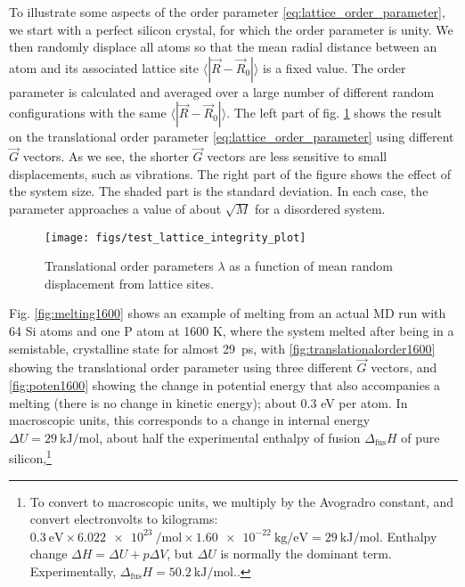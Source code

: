\documentclass[11pt,bibliography=totoc,index=totoc]{scrbook}   %
\begin{document}

To illustrate some aspects of the order parameter \ref{eq:lattice_order_parameter}, we start with a perfect silicon crystal, 
for which the order parameter is unity. 
We then randomly displace all atoms so that the mean radial distance between an atom and its associated lattice site $\langle |\vec{R}-\vec{R}_0|\rangle$ is a fixed value. 
The order parameter is calculated and averaged over a large number of different random configurations with the same $\langle |\vec{R}-\vec{R}_0|\rangle$.
The left part of fig. \ref{fig:tlotest} shows the result on the translational order parameter \eqref{eq:lattice_order_parameter} using different $\vec{G}$ vectors.
As we see, the shorter $\vec{G}$ vectors are less sensitive to small displacements, such as vibrations.
The right part of the figure shows the effect of the system size. The shaded part is the standard deviation.
In each case, the parameter approaches a value of about $\sqrt{M}$ for a disordered system.

\begin{figure}[htbp]
  \begin{center}
    \texttt{[image: figs/test\_lattice\_integrity\_plot]}
  \end{center}
  \caption{Translational order parameters $\lambda$ as a function of mean random displacement from lattice sites.}
  \label{fig:tlotest}
\end{figure}

Fig. \ref{fig:melting1600} shows an example of melting from an actual MD run with 64 Si atoms and one P atom at 1600 K, where the system melted after being in a semistable, crystalline state for almost 29~ps,
with \ref{fig:translationalorder1600} showing the translational order parameter using three different $\vec{G}$ vectors,
and \ref{fig:poten1600} showing the change in potential energy that also accompanies a melting (there is no change in kinetic energy); about 0.3 eV per atom.
In macroscopic units, this corresponds to a change in internal energy $\Delta U = \SI{29}{\kilo\joule\per\mole}$, about half the experimental enthalpy of fusion $\Delta_{\text{fus}}H$ of pure silicon,\footnote{To convert to macroscopic units, we multiply by the Avogradro constant, and convert electronvolts to kilograms:
$\SI{0.3}{\electronvolt}\times\SI{6.022e23}{\per\mole}\times\SI{1.60e-22}{\kilogram\per\electronvolt} = \SI{29}{\kilo\joule\per\mole}$. 
Enthalpy change $\Delta H = \Delta U + p\Delta V$, but $\Delta U$ is normally the dominant term.
Experimentally, $\Delta_{\text{fus}} H = \SI{50.2}{\kilo\joule\per\mole}$.\cite[6.130]{CRC:85}.}
 
\end{document}
